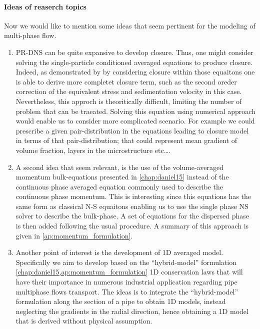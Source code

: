 \paragraph*{Ideas of reaserch topics}
Now we would like to mention some ideas that seem pertinent for the modeling of multi-phase flow. 
\begin{enumerate}
    \item PR-DNS can be quite expansive to develop closure. 
    Thus, one might consider solving the single-particle conditioned averaged equations to produce closure.  
    Indeed, as demonstrated by \citet{hinch1977averaged} by considering closure within those equaitons one is able to derive more completet closure term, such as the second oreder correction of the equivalent stress and sedimentation velocity in this case. 
    Nevertheless, this approch is theoritically difficult, limiting the number of problem that can be traeated. 
    Solving this equation using numerical approach would enable us to consider more complicated scenario. 
    For example we could prescribe a given pair-distribution in the equations leading to closure model in terms of that pair-distribution; that could represent mean gradient of volume fraction, layers in the microstructure etc\ldots. 
    \item A second idea that seem relevant, is the use of the volume-averaged momentum bulk-equations presented in \ref{chap:daniel15} instead of the continuous phase averaged equation commonly used to describe the continuous phase momentum.
    This is interesting since this equations has the same form as classical N-S equaitons enabling us to use the single phase NS solver to describe the bulk-phase. 
    A set of equations for the dispersed phase is then added following the usual procedure. 
    A summary of this approach is given in \ref{ap:momentum_formulation}. 
    \item Another point of interest is the development of 1D averaged model. 
    Specifically we aim to develop based on the ``hybrid-model'' formulation \eqref{chap:daniel15,ap:momentum_formulation} 1D conservation laws that will have their importance in numerous industrial application regarding pipe multiphase flows transport. 
    The ideas is to integrate the ``hybrid-model'' formulation along the section of a pipe to obtain 1D models, instead neglecting the gradients in the radial direction, hence obtaining a 1D model that is derived without physical assumption. 
\end{enumerate}
